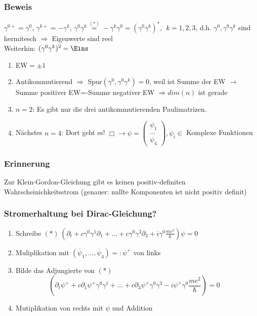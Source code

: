 \documentclass[twoside,a4paper]{scrartcl}
\renewcommand{\1}{\mathds{1}}
\newcommand{\Ra}{\Rightarrow}
\newcommand{\ra}{\rightarrow}
\begin{document}
\subsubsection*{Beweis}
$\gamma^{0+}=\gamma^0$, $\gamma^{k+}=-\gamma^k$, $\gamma^0\gamma^k\stackrel{(*)}{=}-\gamma^k\gamma^0=(\gamma^0\gamma^k)^*, \ \ k=1,2,3$, d.h. $\gamma^0, \gamma^0\gamma^k$ sind hermitesch $\Ra$ Eigenwerte sind reel\\
Weiterhin: $(\gamma^0\gamma^k)^2=\Eins$
\begin{enumerate}
\item EW$=\pm 1$
\item Antikommutierend $\Ra$ Spur$(\gamma^0,\gamma^0\gamma^k)=0$, weil ist Summe der EW $\ra$ Summe positiver EW=-Summe negativer EW $\Ra dim(n)$ ist gerade
\item \underline{$n=2$}: Es gibt nur die drei antikommutierenden Paulimatrizen.
\item Nächstes \underline{$n=4$}: Dort geht es! $\Box \ra \psi=\begin{pmatrix} \psi_1 \\ ... \\ \psi_4 \end{pmatrix}, \psi_i \in$ Komplexe Funktionen
\end{enumerate}

\subsubsection*{Erinnerung}
Zur Klein-Gordon-Gleichung gibt es keinen positiv-definiten Wahrscheinichkeitsstrom (genauer: nullte Komponenten ist nicht positiv definit)
\subsubsection*{Stromerhaltung bei Dirac-Gleichung?}
\begin{enumerate}
\item Schreibe $(*) \ (\partial_t+c\gamma^0\gamma^1 \partial_1+...+c\gamma^0\gamma^3 \partial_3+i\gamma^0\frac{mc^2}{\hbar})\psi=0$
\item Muliplikation mit $(\overline{\psi}_1,...,\overline{\psi}_4)=:\psi^+$ von links
\item Bilde das Adjungierte von $(*)$ 
$$(\partial_t \psi^++c\partial_1\psi^+\gamma^0\gamma^1 +...+c\partial_3\psi^+\gamma^0\gamma^3 -i\psi^+\gamma^0\frac{mc^2}{\hbar})=0$$
\item Mutiplikation von rechts mit $\psi$ und Addition
\end{enumerate}
\end{document}
